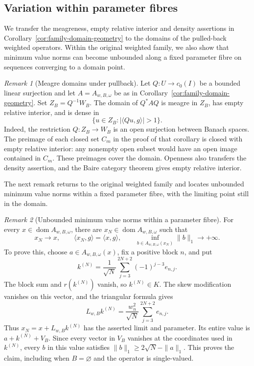 \documentclass[11pt]{article}
\newcommand{\dom}{\operatorname{dom}}
\newcommand{\pair}[2]{\langle #1,#2\rangle}
\theoremstyle{definition}
\theoremstyle{remark}
\newtheorem{remark}{Remark}
\begin{document}
\subsection{Variation within parameter fibres}
\label{subsec:appendix-fibre-variation}

We transfer the meagreness, empty relative interior and density assertions in Corollary~\ref{cor:family-domain-geometry} to the domains of the pulled-back weighted operators. Within the original weighted family, we also show that minimum value norms can become unbounded along a fixed parameter fibre on sequences converging to a domain point.

\begin{remark}[Meagre domains under pullback]
\label{rem:meagre-pullback}
Let $Q:U\to c_0(I)$ be a bounded linear surjection and let $A=A_{w,B,\omega}$ be as in Corollary~\ref{cor:family-domain-geometry}. Set $Z_B=Q^{-1}W_B$. The domain of $Q^*AQ$ is meagre in $Z_B$, has empty relative interior, and is dense in
\[
\{u\in Z_B:|\pair{Qu}{g}|>1\}.
\]
Indeed, the restriction $Q:Z_B\to W_B$ is an open surjection between Banach spaces. The preimage of each closed set $C_m$ in the proof of that corollary is closed with empty relative interior: any nonempty open subset would have an open image contained in $C_m$. These preimages cover the domain. Openness also transfers the density assertion, and the Baire category theorem gives empty relative interior.
\end{remark}

The next remark returns to the original weighted family and locates unbounded minimum value norms within a fixed parameter fibre, with the limiting point still in the domain.

\begin{remark}[Unbounded minimum value norms within a parameter fibre]
\label{rem:fibre-minimum-norm}
For every $x\in\dom A_{w,B,\omega}$, there are $x_N\in\dom A_{w,B,\omega}$ such that
\[
x_N\longrightarrow x,\qquad
\pair{x_N}{g}=\pair{x}{g},\qquad
\inf_{b\in A_{w,B,\omega}(x_N)}\|b\|_1\longrightarrow+\infty.
\]
To prove this, choose $a\in A_{w,B,\omega}(x)$, fix a positive block $n$, and put
\[
k^{(N)}=\frac1{\sqrt N}\sum_{j=3}^{2N+2}(-1)^{j-3}e_{n,j}.
\]
The block sum and $r(k^{(N)})$ vanish, so $k^{(N)}\in K$. The skew modification vanishes on this vector, and the triangular formula gives
\[
L_{w,B}k^{(N)}=\frac{w_n^2}{\sqrt N}\sum_{j=3}^{2N+2}e_{n,j}.
\]
Thus $x_N=x+L_{w,B}k^{(N)}$ has the asserted limit and parameter. Its entire value is $a+k^{(N)}+V_B$. Since every vector in $V_B$ vanishes at the coordinates used in $k^{(N)}$, every $b$ in this value satisfies $\|b\|_1\ge2\sqrt N-\|a\|_1$. This proves the claim, including when $B=\varnothing$ and the operator is single-valued.
\end{remark}
\end{document}
